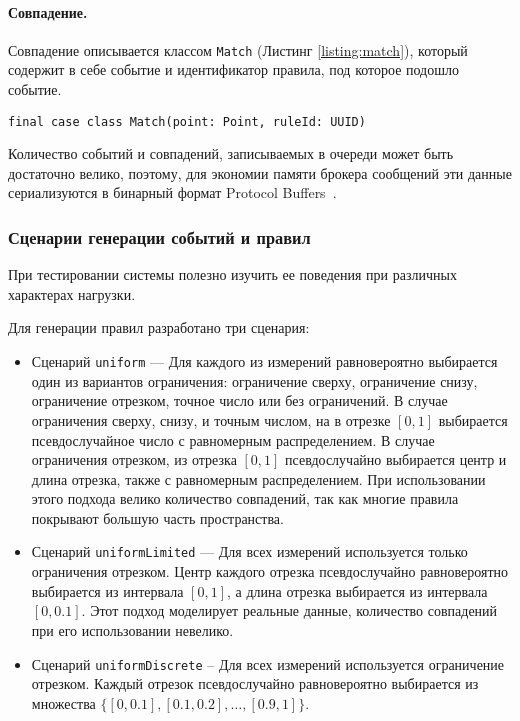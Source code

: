 \documentclass[14pt]{article}
\begin{document}
\paragraph{Совпадение.} Совпадение описывается классом \verb|Match| (Листинг \ref{listing:match}), который содержит в себе событие и идентификатор правила, под которое подошло событие.
\begin{lstlisting}[style=scalaStyle,caption={Класс, описывающий совпадение},label={listing:match},captionpos=b, float]
final case class Match(point: Point, ruleId: UUID)
\end{lstlisting}

Количество событий и совпадений, записываемых в очереди может быть достаточно велико, поэтому, для экономии памяти брокера сообщений эти данные сериализуются в бинарный формат Protocol Buffers~\cite{protobuf}.

\subsubsection{Сценарии генерации событий и правил}
При тестировании системы полезно изучить ее поведения при различных характерах нагрузки.

Для генерации правил разработано три сценария:
\begin{itemize}
    \item Сценарий \verb|uniform| --- Для каждого из измерений равновероятно выбирается один из вариантов ограничения: ограничение сверху, ограничение снизу, ограничение отрезком, точное число или без ограничений. В случае ограничения сверху, снизу, и точным числом, на в отрезке $[0, 1]$ выбирается псевдослучайное число с равномерным распределением. В случае ограничения отрезком, из отрезка $[0, 1]$ псевдослучайно выбирается центр и длина отрезка, также с равномерным распределением. При использовании этого подхода велико количество совпадений, так как многие правила покрывают большую часть пространства.

    \item Сценарий \verb|uniformLimited| --- Для всех измерений используется только ограничения отрезком. Центр каждого отрезка псевдослучайно равновероятно выбирается из интервала $[0, 1]$, а длина отрезка выбирается из интервала $[0, 0.1]$. Этот подход моделирует реальные данные, количество совпадений при его использовании невелико.

    \item Сценарий \verb|uniformDiscrete| -- Для всех измерений используется ограничение отрезком. Каждый отрезок псевдослучайно равновероятно выбирается из множества $\{[0, 0.1], [0.1, 0.2],\dots,[0.9, 1]\}$.
\end{itemize}
\end{document}
